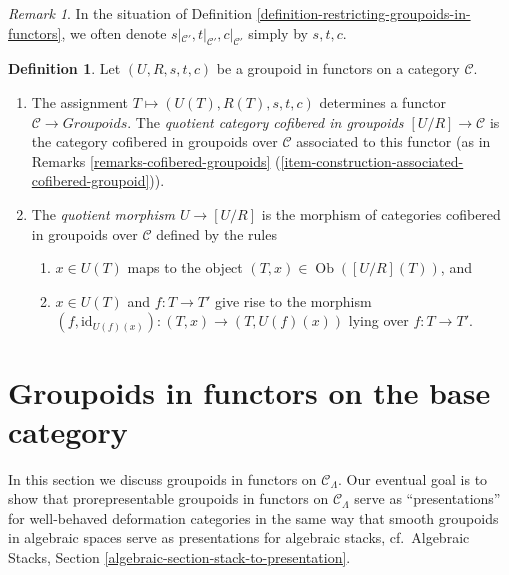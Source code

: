 \documentclass{stacks-project}
\theoremstyle{plain}
\theoremstyle{definition}
\newtheorem{definition}[subsection]{Definition}
\theoremstyle{remark}
\newtheorem{remark}[subsection]{Remark}
\numberwithin{equation}{subsection}
\def\Ob{\mathop{\mathrm{Ob}}\nolimits}
\begin{document}
\begin{remark}
\label{remark-notation-restriction}
In the situation of Definition
\ref{definition-restricting-groupoids-in-functors}, we often denote
$s|_{\mathcal{C}'}, t|_{\mathcal{C}'}, c|_{\mathcal{C}'}$ simply by $s, t, c$.
\end{remark}

\begin{definition}
\label{definition-quotient}
Let $(U, R, s, t, c)$ be a groupoid in functors on a category $\mathcal{C}$.
\begin{enumerate}
\item The assignment $T \mapsto  (U(T), R(T), s, t, c)$ determines a functor
$\mathcal{C} \to \textit{Groupoids}$. The {\it quotient category
cofibered in groupoids $[U/R] \to \mathcal{C}$} is the category
cofibered in groupoids over $\mathcal{C}$ associated to this functor (as in
Remarks \ref{remarks-cofibered-groupoids}
(\ref{item-construction-associated-cofibered-groupoid})).
\item The {\it quotient morphism $U \to [U/R]$} is the morphism of
categories cofibered in groupoids over $\mathcal{C}$ defined by the
rules
\begin{enumerate}
\item $x \in U(T)$ maps to the object $(T, x) \in \Ob([U/R](T))$, and
\item $x \in U(T)$ and $f : T \to T'$ give rise to the morphism
$(f, \text{id}_{U(f)(x)}): (T, x) \to (T, U(f)(x))$ lying over
$f : T \to T'$.
\end{enumerate}
\end{enumerate}
\end{definition}





\section{Groupoids in functors on the base category}
\label{section-prorepresentable-groupoids-in-functors}

\noindent
In this section we discuss groupoids in functors on $\mathcal{C}_\Lambda$.
Our eventual goal is to show that prorepresentable groupoids
in functors on $\mathcal{C}_\Lambda$ serve as ``presentations''
for well-behaved deformation categories in the same way that
smooth groupoids in algebraic spaces serve as presentations for
algebraic stacks,
cf.\ Algebraic Stacks, Section \ref{algebraic-section-stack-to-presentation}.
\end{document}
